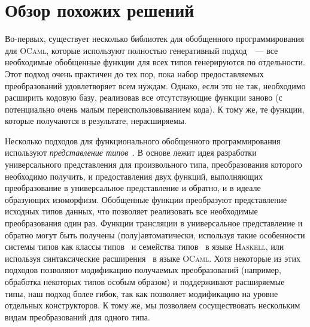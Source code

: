 \section{Обзор похожих решений}
\label{sec:relatedworks}


Во-первых, существует несколько библиотек для обобщенного программирования для \textsc{OCaml}, которые используют полностью генеративный подход~\cite{Yallop,PPXLib}~--- все необходимые обобщенные функции для всех типов генерируются по отдельности. Этот подход очень практичен до тех пор, пока набор предоставляемых преобразований удовлетворяет всем нуждам. Однако, если это не так, необходимо расширить кодовую базу, реализовав все отсутствующие функции заново
(с потенциально очень малым переиспользовыванием кода). К тому же, те функции,
которые получаются в результате, нерасширяемы. 

\begin{comment}

В нашем подходе, во-первых,
большое количество полезных обобщенных функций может быть получено из уже сгенерированных. Во-вторых, чтобы получить полностью новый плагин, достаточно модифицировать только ``интересные'' части, так как функции обхода и класс для объекта преобразования библиотека создает самостоятельно.
\end{comment}

Несколько подходов для функционального обобщенного программирования используют 
\emph{представление типов}~\cite{Hinze}. В основе лежит идея разработки универсального представления для произвольного типа, преобразования которого необходимо получить, и предоставления двух функций, выполняющих преобразование в универсальное представление и обратно, и в идеале образующих изоморфизм. Обобщенные функции преобразуют представление исходных типов данных, что позволяет реализовать все необходимые преобразования один раз. Функции трансляции в универсальное представление и обратно могут быть получены (полу)автоматически, используя такие особенности системы типов  как классы типов~\cite{Hinze,ALaCarte} и семейства типов~\cite{InstantGenerics} в языке \textsc{Haskell}, или  используя синтаксические расширения~\cite{GenericOCaml} в языке \textsc{OCaml}. Хотя некоторые из этих подходов позволяют модификацию получаемых преобразований (например, обработка некоторых типов особым образом) и поддерживают расширяемые типы, наш подход более гибок, так как позволяет модификацию на уровне отдельных конструкторов. К тому же, мы позволяем сосуществовать нескольким видам преобразований для одного типа.


